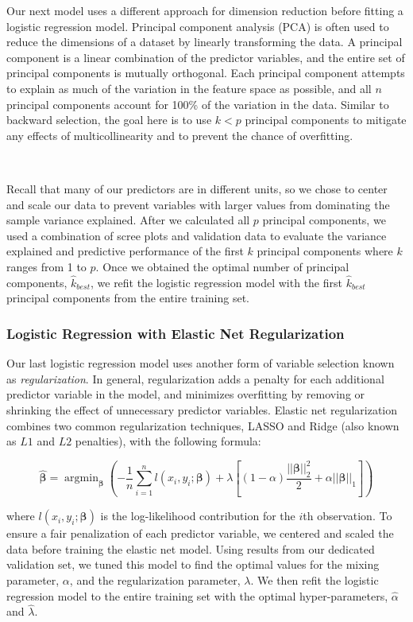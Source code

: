 \documentclass[10pt]{article}
\DeclareMathOperator*{\argmin}{argmin}
\begin{document}
Our next model uses a different approach for dimension reduction before fitting a logistic regression model. Principal component analysis (PCA) is often used to reduce the dimensions of a dataset by linearly transforming the data. A principal component is a linear combination of the predictor variables, and the entire set of principal components is mutually orthogonal. Each principal component attempts to explain as much of the variation in the feature space as possible, and all $n$ principal components account for 100\% of the variation in the data. Similar to backward selection, the goal here is to use $k < p$ principal components to mitigate any effects of multicollinearity and to prevent the chance of overfitting.

\

Recall that many of our predictors are in different units, so we chose to center and scale our data to prevent variables with larger values from dominating the sample variance explained. After we calculated all $p$ principal components, we used a combination of scree plots and validation data to evaluate the variance explained and predictive performance of the first $k$ principal components where $k$ ranges from 1 to $p$. Once we obtained the optimal number of principal components, $\hat{k}_{best}$, we refit the logistic regression model with the first $\hat{k}_{best}$ principal components from the entire training set.

\subsubsection*{Logistic Regression with Elastic Net Regularization}

Our last logistic regression model uses another form of variable selection known as \textit{regularization}. In general, regularization adds a penalty for each additional predictor variable in the model, and minimizes overfitting by removing or shrinking the effect of unnecessary predictor variables. Elastic net regularization combines two common regularization techniques, LASSO and Ridge (also known as $L1$ and $L2$ penalties), with the following formula:

$$\hat{\boldsymbol{\beta}} = \argmin_{\boldsymbol{\beta}} \left( -\frac{1}{n} \sum_{i = 1}^{n} l(x_i, y_i; \boldsymbol{\beta}) + \lambda \left[(1- \alpha)\frac{||\boldsymbol{\beta}||_{2}^{2}}{2} + \alpha||\boldsymbol{\beta}||_{1} \right] \right)$$

where $l(x_i, y_i; \boldsymbol{\beta})$ is the log-likelihood contribution for the $i$th observation. To ensure a fair penalization of each predictor variable, we centered and scaled the data before training the elastic net model. Using results from our dedicated validation set, we tuned this model to find the optimal values for the mixing parameter, $\alpha$, and the regularization parameter, $\lambda$. We then refit the logistic regression model to the entire training set with the optimal hyper-parameters, $\hat{\alpha}$
and $\hat{\lambda}$.
\end{document}
